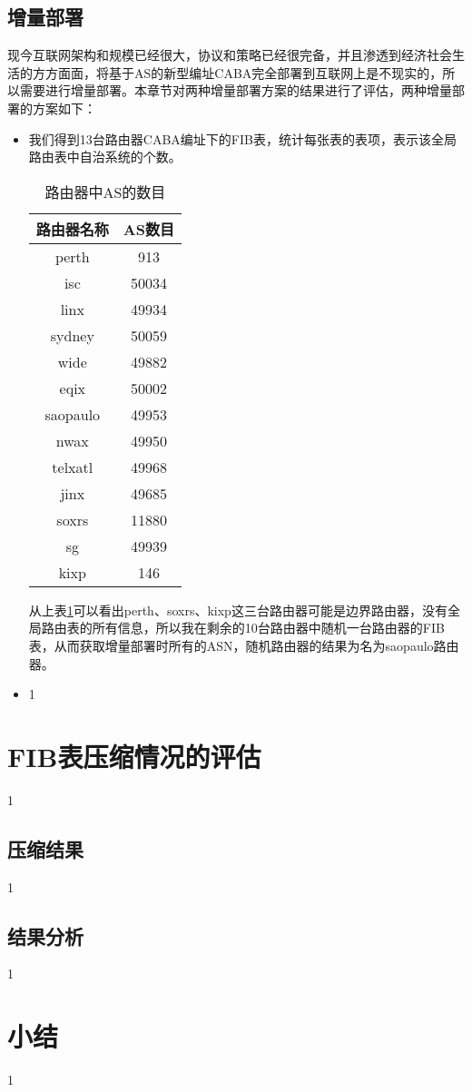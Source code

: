 \subsection{增量部署}
现今互联网架构和规模已经很大，协议和策略已经很完备，并且渗透到经济社会生活的方方面面，将基于AS的新型编址CABA完全部署到互联网上是不现实的，所以需要进行增量部署。本章节对两种增量部署方案的结果进行了评估，两种增量部署的方案如下：
\begin{itemize}
\item 我们得到13台路由器CABA编址下的FIB表，统计每张表的表项，表示该全局路由表中自治系统的个数。

\begin{table}[h]
    \centering
    \caption{路由器中AS的数目}
    \label{tab:routeasnum}
        \begin{tabular}{|c|c|}
            \hline
            路由器名称 & AS数目 \\ \hline
            perth & 913 \\ \hline
            isc   & 50034 \\ \hline
            linx & 49934  \\ \hline
            sydney& 50059  \\ \hline
            wide  & 49882  \\ \hline
            eqix  & 50002  \\ \hline
            saopaulo & 49953 \\ \hline
            nwax  & 49950   \\ \hline
            telxatl  & 49968 \\ \hline
            jinx  & 49685 \\ \hline
            soxrs  & 11880  \\ \hline
            sg    & 49939 \\  \hline
            kixp & 146 \\ 
            \hline
        \end{tabular}
\end{table}

从上表\ref{tab:routeasnum}可以看出perth、soxrs、kixp这三台路由器可能是边界路由器，没有全局路由表的所有信息，所以我在剩余的10台路由器中随机一台路由器的FIB表，从而获取增量部署时所有的ASN，随机路由器的结果为名为saopaulo路由器。
\item 1
\end{itemize}
\section{FIB表压缩情况的评估}
1
\subsection{压缩结果}
1
\subsection{结果分析}
1
\section{小结}
1
